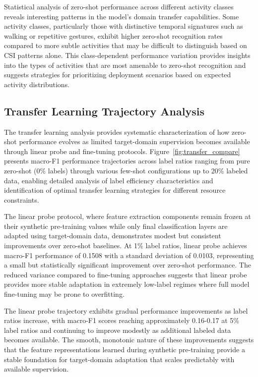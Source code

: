 \documentclass[journal]{IEEEtran}
\begin{document}
Statistical analysis of zero-shot performance across different activity classes reveals interesting patterns in the model's domain transfer capabilities. Some activity classes, particularly those with distinctive temporal signatures such as walking or repetitive gestures, exhibit higher zero-shot recognition rates compared to more subtle activities that may be difficult to distinguish based on CSI patterns alone. This class-dependent performance variation provides insights into the types of activities that are most amenable to zero-shot recognition and suggests strategies for prioritizing deployment scenarios based on expected activity distributions.

\subsection{Transfer Learning Trajectory Analysis}

The transfer learning analysis provides systematic characterization of how zero-shot performance evolves as limited target-domain supervision becomes available through linear probe and fine-tuning protocols. Figure~\ref{fig:transfer_compare} presents macro-F1 performance trajectories across label ratios ranging from pure zero-shot (0\% labels) through various few-shot configurations up to 20\% labeled data, enabling detailed analysis of label efficiency characteristics and identification of optimal transfer learning strategies for different resource constraints.

The linear probe protocol, where feature extraction components remain frozen at their synthetic pre-training values while only final classification layers are adapted using target-domain data, demonstrates modest but consistent improvements over zero-shot baselines. At 1\% label ratios, linear probe achieves macro-F1 performance of 0.1508 with a standard deviation of 0.0103, representing a small but statistically significant improvement over zero-shot performance. The reduced variance compared to fine-tuning approaches suggests that linear probe provides more stable adaptation in extremely low-label regimes where full model fine-tuning may be prone to overfitting.

The linear probe trajectory exhibits gradual performance improvements as label ratios increase, with macro-F1 scores reaching approximately 0.16-0.17 at 5\% label ratios and continuing to improve modestly as additional labeled data becomes available. The smooth, monotonic nature of these improvements suggests that the feature representations learned during synthetic pre-training provide a stable foundation for target-domain adaptation that scales predictably with available supervision.
\end{document}
